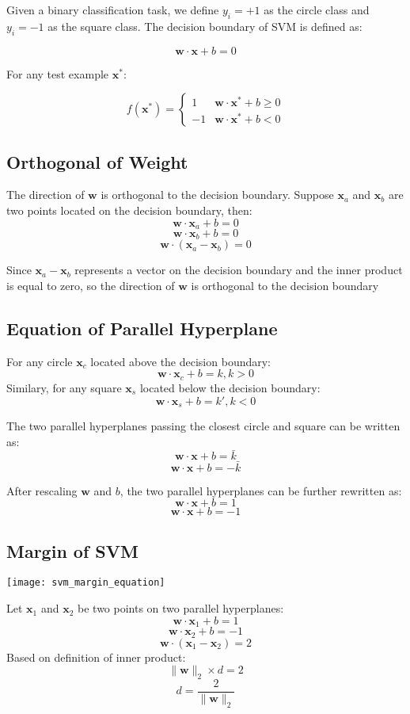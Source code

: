 \begin{multicols}{2}
\noindent Given a binary classification task, we define $y_i=+1$ as the circle class and $y_i=-1$ as the square class. The decision boundary of SVM is defined as:

$$\mathbf{w} \cdot \mathbf{x} + b = 0$$

\noindent For any test example $\mathbf{x^*}$:

$$
f(\mathbf{x^*}) = 
\begin{cases}
1 & \mathbf{w} \cdot \mathbf{x^*} + b \ge 0 \\
-1 & \mathbf{w} \cdot \mathbf{x^*} + b < 0
\end{cases}
$$

\subsection{Orthogonal of Weight}

\noindent The direction of $\mathbf{w}$ is orthogonal to the decision boundary. Suppose $\mathbf{x}_a$ and $\mathbf{x}_b$ are two points located on the decision boundary, then:
$$\mathbf{w} \cdot \mathbf{x}_a + b = 0$$
$$\mathbf{w} \cdot \mathbf{x}_b + b = 0$$
$$\mathbf{w} \cdot (\mathbf{x}_a -\mathbf{x}_b) = 0$$

\noindent Since $\mathbf{x}_a -\mathbf{x}_b$ represents a vector on the decision boundary and the inner product is equal to zero, so the direction of $\mathbf{w}$ is orthogonal to the decision boundary

\subsection{Equation of Parallel Hyperplane}

\noindent For any circle $\mathbf{x}_c$ located above the decision boundary:
$$\mathbf{w} \cdot \mathbf{x}_c + b = k, k>0$$
\noindent Similary, for any square $\mathbf{x}_s$ located below the decision boundary:
$$\mathbf{w} \cdot \mathbf{x}_s + b = k', k<0$$

\noindent The two parallel hyperplanes passing the closest circle and square can be written as:
$$\mathbf{w} \cdot \mathbf{x} + b = \bar{k}$$
$$\mathbf{w} \cdot \mathbf{x} + b = -\bar{k}$$

\noindent After rescaling $\mathbf{w}$ and $b$, the two parallel hyperplanes can be further rewritten as:
$$\mathbf{w} \cdot \mathbf{x} + b = 1$$
$$\mathbf{w} \cdot \mathbf{x} + b = -1$$

\subsection{Margin of SVM}
\begin{center}
\texttt{[image: svm\_margin\_equation]}
\end{center}
\noindent Let $\mathbf{x}_1$ and $\mathbf{x}_2$ be two points on two parallel hyperplanes:
$$\mathbf{w} \cdot \mathbf{x}_1 + b = 1$$
$$\mathbf{w} \cdot \mathbf{x}_2 + b = -1$$
$$\mathbf{w} \cdot (\mathbf{x}_1 - \mathbf{x}_2)= 2$$
\noindent Based on definition of inner product:
$$\| \mathbf{w} \|_2 \times d = 2$$
$$d = \frac{2}{\| \mathbf{w} \|_2}$$


\end{multicols}
